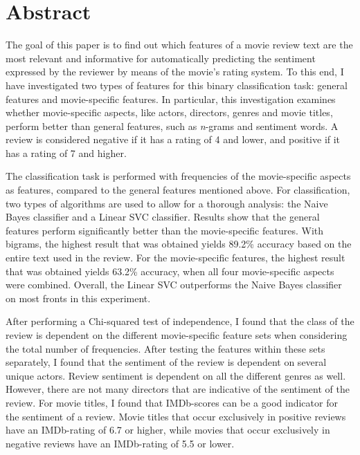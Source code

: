 \documentclass[
10pt, %
a4paper, %
oneside, %
headinclude,footinclude, %
] {book}%
\begin{document}

\chapter*{Abstract}

The goal of this paper is to find out which features of a movie review text are the most relevant and informative for automatically predicting the sentiment expressed by the reviewer by means of the movie's rating system. To this end, I have investigated two types of features for this binary classification task: general features and movie-specific features. In particular, this investigation examines whether movie-specific aspects, like actors, directors, genres and movie titles, perform better than general features, such as \textit n-grams and sentiment words. A review is considered negative if it has a rating of 4 and lower, and positive if it has a rating of 7 and higher.

The classification task is performed with frequencies of the movie-specific aspects as features, compared to the general features mentioned above. For classification, two types of algorithms are used to allow for a thorough analysis: the Naive Bayes classifier and a Linear SVC classifier. Results show that the general features perform significantly better than the movie-specific features. With bigrams, the highest result that was obtained yields 89.2\% accuracy based on the entire text used in the review. For the movie-specific features, the highest result that was obtained yields 63.2\% accuracy, when all four movie-specific aspects were combined. Overall, the Linear SVC outperforms the Naive Bayes classifier on most fronts in this experiment.

After performing a Chi-squared test of independence, I found that the class of the review is dependent on the different movie-specific feature sets when considering the total number of frequencies. After testing the features within these sets separately, I found that the sentiment of the review is dependent on several unique actors. Review sentiment is dependent on all the different genres as well.  However, there are not many directors that are indicative of the sentiment of the review. For movie titles, I found that IMDb-scores can be a good indicator for the sentiment of a review. Movie titles that occur exclusively in positive reviews have an IMDb-rating of 6.7 or higher, while movies that occur exclusively in negative reviews have an IMDb-rating of 5.5 or lower. 
\end{document}
